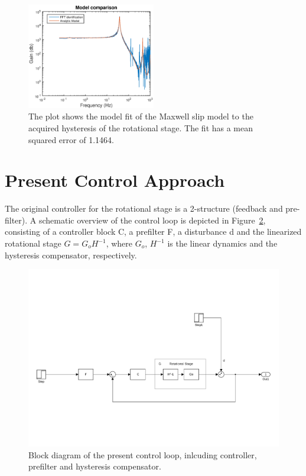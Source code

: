 \begin{figure}[h]
  \centering
  \includegraphics[width=0.5\textwidth]{fig/matlab/model.eps}
  \caption{\label{fig:model} The plot shows the model fit of the Maxwell slip model to the acquired hysteresis of the rotational stage. The fit has a mean squared error of 1.1464.}
\end{figure}

\section{Present Control Approach}
The original controller for the rotational stage is a 2-\abbrDOF structure (feedback and pre-filter). A schematic overview of the control loop is depicted in Figure~\ref{fig:present}, consisting of a controller block C, a prefilter F, a disturbance d and the linearized rotational stage $G =G_oH^{-1}$, where $G_o$, $H^{-1}$ is the linear dynamics and the hysteresis compensator, respectively.

\begin{figure}[h]
  \centering %
  \includegraphics[width=1\textwidth, trim=4cm 3cm 2.1cm 10cm, clip=true]{fig/matlab/present_controller}
  \caption{\label{fig:present}Block diagram of the present control loop, inlcuding controller, prefilter and hysteresis compensator.}
\end{figure}

